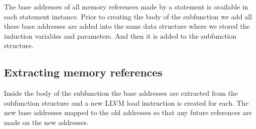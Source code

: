 The base addresses of all memory references made by a statement is available in each statement instance. Prior to creating the body
of the subfunction we add all these base addresses are added into the same data structure where we stored the induction variables and parameters.
And then it is added to the subfunction structure.

\subsection{Extracting memory references}

Inside the body of the subfunction the base addresses are extracted from the subfunction structure and a new LLVM load instruction is created for each. The
new base addresses mapped to the old addresses so that any future references are made on the new addresses.

